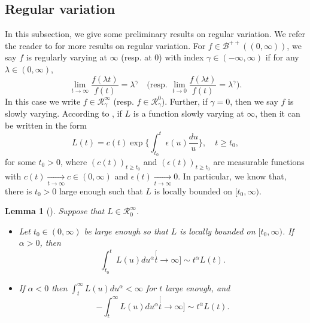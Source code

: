 \documentclass[12pt, a4paper]{amsart}
\newtheorem{lem}[thm]{Lemma}
\theoremstyle{definition}
\numberwithin{equation}{section}
\begin{document}
\subsection{Regular variation}
\label{sec: Regularly variation}
	In this subsection, we give some preliminary results on regular variation.
	We refer the reader to \cite{BinghamGoldieTeugels1989Regular} for more results on  regular variation.
	For $f\in \mathscr B^{++}((0,\infty))$, we say $f$ is regularly varying at $\infty$ (resp. at $0$) with index $\gamma \in (-\infty,\infty)$ if for any $\lambda \in (0,\infty)$,
\begin{equation}
	\lim_{t\to\infty}\frac{f(\lambda t)}{f(t)}
	= \lambda^\gamma
	\quad \Big(\text{resp. } \lim_{t\to 0}\frac{f(\lambda t)}{f(t)}
	= \lambda^\gamma\Big).
\end{equation}
	In this case we write  $f\in \mathcal R^\infty_\gamma$ (resp. $f\in \mathcal R^0_\gamma$).
	Further, if $\gamma = 0$, then we say $f$ is slowly varying.
	According to \cite[Theorem 1.3.1.]{BinghamGoldieTeugels1989Regular}, if $L$ is a function slowly varying at $\infty$, then it can be written in the form
\begin{equation}
	L(t)
	= c(t) \exp\Big\{\int_{t_0}^t \epsilon(u) \frac{du}{u}\Big\},\quad t\geq t_0,
\end{equation}
	for some $t_0>0$, where $(c(t))_{t\geq t_0}$ and $(\epsilon(t))_{t\geq t_0}$ are measurable functions with $c(t) \xrightarrow[t\to \infty]{} c \in (0,\infty)$ and $\epsilon(t) \xrightarrow[t\to \infty]{} 0$.
	In particular, we know that, there is $t_0 > 0$ large enough such that $L$ is locally bounded on $[t_0,\infty)$.

\begin{lem}[{\cite[Propositions 1.5.8. and 1.5.10]{BinghamGoldieTeugels1989Regular}}]
\label{lem: exchange slowly varying function and integration}
	Suppose that $L\in \mathcal R^\infty_0$.
\begin{itemize}
\item
	Let $t_0\in (0,\infty)$ be large enough so that $L$ is locally bounded on $[t_0,\infty)$. If $\alpha>0 $, then
\begin{equation}
	\int_{t_0}^t L(u)du^\alpha
	\stackrel[t\to \infty]{}{\sim} t^\alpha L(t).
\end{equation}
\item
	If $\alpha< 0$ then $\int_t^\infty L(u) du^\alpha < \infty$ for $t$ large enough, and
\begin{equation}
	-\int_t^\infty L(u)du^\alpha
	\stackrel[t\to \infty]{}{\sim} t^\alpha L(t).
\end{equation}
\end{itemize}
\end{lem}
\end{document}

